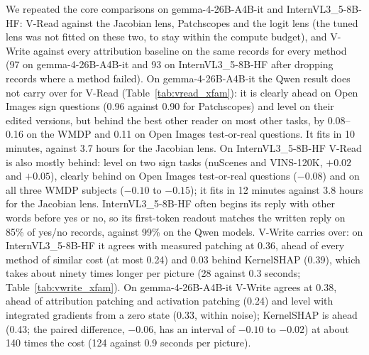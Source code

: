 We repeated the core comparisons on gemma-4-26B-A4B-it and InternVL3\_5-8B-HF: V-Read against the Jacobian lens, Patchscopes and the logit lens (the tuned lens was not fitted on these two, to stay within the compute budget), and V-Write against every attribution baseline on the same records for every method (97 on gemma-4-26B-A4B-it and 93 on InternVL3\_5-8B-HF after dropping records where a method failed). On gemma-4-26B-A4B-it the Qwen result does not carry over for V-Read (Table~\ref{tab:vread_xfam}): it is clearly ahead on Open Images sign questions (0.96 against 0.90 for Patchscopes) and level on their edited versions, but behind the best other reader on most other tasks, by 0.08--0.16 on the WMDP and 0.11 on Open Images test-or-real questions. It fits in 10 minutes, against 3.7 hours for the Jacobian lens. On InternVL3\_5-8B-HF V-Read is also mostly behind: level on two sign tasks (nuScenes and VINS-120K, $+0.02$ and $+0.05$), clearly behind on Open Images test-or-real questions ($-0.08$) and on all three WMDP subjects ($-0.10$ to $-0.15$); it fits in 12 minutes against 3.8 hours for the Jacobian lens. InternVL3\_5-8B-HF often begins its reply with other words before yes or no, so its first-token readout matches the written reply on 85\% of yes/no records, against 99\% on the Qwen models. V-Write carries over: on InternVL3\_5-8B-HF it agrees with measured patching at 0.36, ahead of every method of similar cost (at most 0.24) and 0.03 behind KernelSHAP (0.39), which takes about ninety times longer per picture (28 against 0.3 seconds; Table~\ref{tab:vwrite_xfam}). On gemma-4-26B-A4B-it V-Write agrees at 0.38, ahead of attribution patching and activation patching (0.24) and level with integrated gradients from a zero state (0.33, within noise); KernelSHAP is ahead (0.43; the paired difference, $-0.06$, has an interval of $-0.10$ to $-0.02$) at about 140 times the cost (124 against 0.9 seconds per picture).


